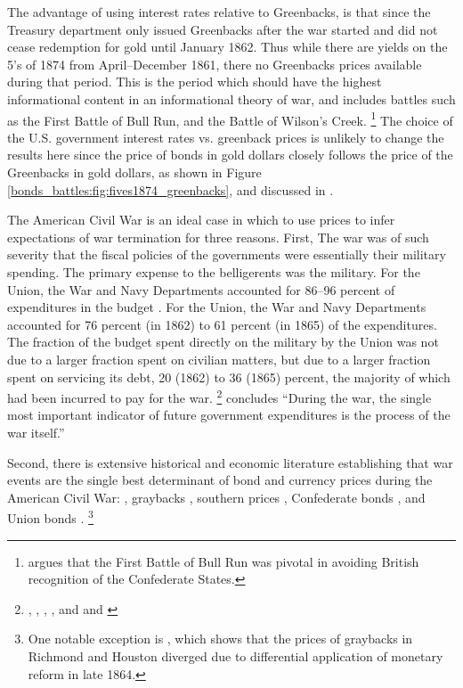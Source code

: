The advantage of using interest rates relative to Greenbacks, is that since the Treasury department only issued Greenbacks after the war started and did not cease redemption for gold until January 1862.
Thus while there are yields on the 5's of 1874 from April--December 1861, there no Greenbacks prices available during that period.
This is the period which should have the highest informational content in an informational theory of war, and includes battles such as the First Battle of Bull Run, and the Battle of Wilson's Creek.%
\footnote{\textcite{Poast2012} argues that the First Battle of Bull Run was pivotal in avoiding British recognition of the Confederate States.}
The choice of the U.S. government interest rates vs. greenback prices is unlikely to change the results here since the price of bonds in gold dollars closely follows the price of the Greenbacks in gold dollars, as shown in Figure \ref{bonds_battles:fig:fives1874_greenbacks}, and discussed in \textcite{Roll1972}.

The American Civil War is an ideal case in which to use prices to
infer expectations of war termination for three reasons. %
First, The war was of such severity that the fiscal policies of the
governments were essentially their military spending. %
The primary expense to the belligerents was the military. %
For the Union, the War and Navy Departments accounted for 86--96
percent of expenditures in the budget \parencites[][259]{Ball1991}[see
also][354-355]{BurdekinLangdana1993}. %
For the Union, the War and Navy Departments accounted for 76 percent
(in 1862) to 61 percent (in 1865) of the expenditures. %
The fraction of the budget spent directly on the military by the Union
was not due to a larger fraction spent on civilian matters, but due to
a larger fraction spent on servicing its debt, 20 (1862) to 36 (1865)
percent, the majority of which had been incurred to pay for the war.%
\footnote{%
  \textcite{Treasury1861a}, \textcite{Treasury1861b},
  \textcite{Treasury1862}, \textcite{Treasury1863}, and
  \textcite{Treasury1864} and \textcite{Treasury1865} %
} %
\parencite[][668]{McCandless1996} concludes ``During the war, the
single most important indicator of future government expenditures is
the process of the war itself.''%

Second, there is extensive historical and economic literature establishing that war events are the single best determinant of bond and currency prices during the American Civil War:
\parencites{Mitchell1903}{Mitchell1908}{Calomiris1988}{WillardGuinnaneEtAl1996}{McCandless1996}{SmithSmith1997},
graybacks \parencites{Schwab1901}{Weidenmier2002}, southern prices
\parencite{BurdekinLangdana1993}, Confederate bonds
\parencites{DavisPecquet1990}{BrownBurdekin2000}{OosterlinckWeidenmier2007},
and Union bonds \parencite{Roll1972}.%
\footnote{One notable exception is \textcite{BurdekinWeidenmier2001},
  which shows that the prices of graybacks in Richmond and Houston
  diverged due to differential application of monetary reform in late
  1864.}

